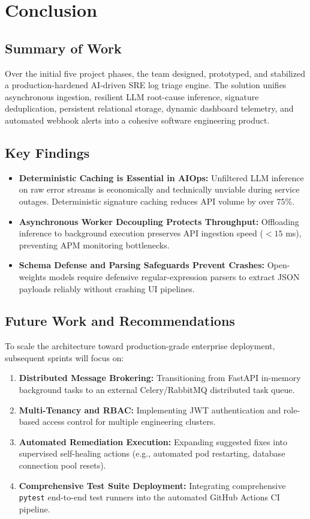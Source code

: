 \documentclass[12pt,a4paper]{report}
\begin{document}
\chapter{Conclusion}

\section{Summary of Work}
Over the initial five project phases, the team designed, prototyped, and stabilized a production-hardened AI-driven SRE log triage engine. The solution unifies asynchronous ingestion, resilient LLM root-cause inference, signature deduplication, persistent relational storage, dynamic dashboard telemetry, and automated webhook alerts into a cohesive software engineering product.

\section{Key Findings}
\begin{itemize}
  \item \textbf{Deterministic Caching is Essential in AIOps:} Unfiltered LLM inference on raw error streams is economically and technically unviable during service outages. Deterministic signature caching reduces API volume by over $75\%$.
  \item \textbf{Asynchronous Worker Decoupling Protects Throughput:} Offloading inference to background execution preserves API ingestion speed ($< 15$ ms), preventing APM monitoring bottlenecks.
  \item \textbf{Schema Defense and Parsing Safeguards Prevent Crashes:} Open-weights models require defensive regular-expression parsers to extract JSON payloads reliably without crashing UI pipelines.
\end{itemize}

\section{Future Work and Recommendations}
To scale the architecture toward production-grade enterprise deployment, subsequent sprints will focus on:
\begin{enumerate}
  \item \textbf{Distributed Message Brokering:} Transitioning from FastAPI in-memory background tasks to an external Celery/RabbitMQ distributed task queue.
  \item \textbf{Multi-Tenancy and RBAC:} Implementing JWT authentication and role-based access control for multiple engineering clusters.
  \item \textbf{Automated Remediation Execution:} Expanding suggested fixes into supervised self-healing actions (e.g., automated pod restarting, database connection pool resets).
  \item \textbf{Comprehensive Test Suite Deployment:} Integrating comprehensive \texttt{pytest} end-to-end test runners into the automated GitHub Actions CI pipeline.
\end{enumerate}
\end{document}
